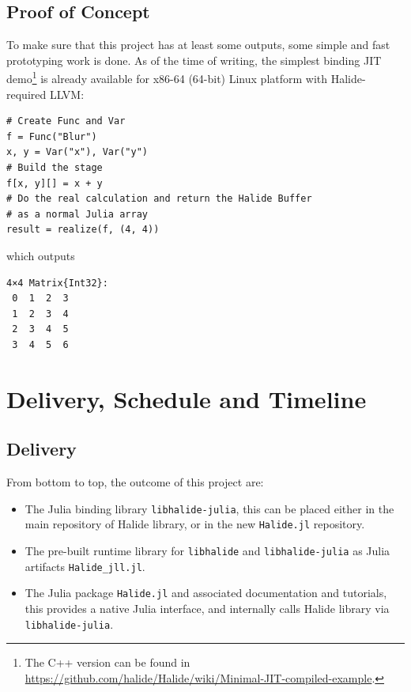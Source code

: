 \documentclass{article}
\begin{document}
\subsection{Proof of Concept}

To make sure that this project has at least some outputs, some simple and fast prototyping work is done. As of the time of writing, the simplest binding JIT demo\footnote{The C++ version can be found in \url{https://github.com/halide/Halide/wiki/Minimal-JIT-compiled-example}.} is already available for x86-64 (64-bit) Linux platform with Halide-required LLVM:

\begin{lstlisting}[language=JuliaLocal]
# Create Func and Var
f = Func("Blur")
x, y = Var("x"), Var("y")
# Build the stage
f[x, y][] = x + y
# Do the real calculation and return the Halide Buffer
# as a normal Julia array
result = realize(f, (4, 4))
\end{lstlisting}

which outputs

\begin{lstlisting}[language=JuliaLocal]
4×4 Matrix{Int32}:
 0  1  2  3
 1  2  3  4
 2  3  4  5
 3  4  5  6
\end{lstlisting}

\section{Delivery, Schedule and Timeline}

\subsection{Delivery}

From bottom to top, the outcome of this project are:

\begin{itemize}
    \item The Julia binding library \lstinline{libhalide-julia}, this can be placed either in the main repository of Halide library, or in the new \lstinline{Halide.jl} repository.
    \item The pre-built runtime library for \lstinline{libhalide} and \lstinline{libhalide-julia} as Julia artifacts \lstinline{Halide_jll.jl}.
    \item The Julia package \lstinline{Halide.jl} and associated documentation and tutorials, this provides a native Julia interface, and internally calls Halide library via \lstinline{libhalide-julia}.
\end{itemize}
\end{document}
